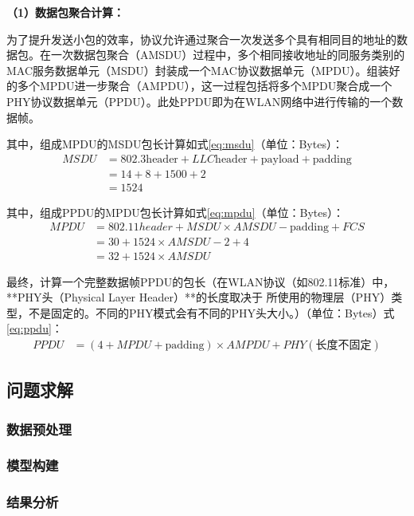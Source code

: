 \documentclass[bwprint]{gmcmthesis}
\begin{document}
\textbf{（1）数据包聚合计算：}

为了提升发送小包的效率，协议允许通过聚合一次发送多个具有相同目的地址的数据包。在一次数据包聚合（AMSDU）过程中，多个相同接收地址的同服务类别的MAC服务数据单元（MSDU）封装成一个MAC协议数据单元（MPDU）。组装好的多个MPDU进一步聚合（AMPDU），这一过程包括将多个MPDU聚合成一个PHY协议数据单元（PPDU）。此处PPDU即为在WLAN网络中进行传输的一个数据帧。

其中，组成MPDU的MSDU包长计算如式\ref{eq:msdu}（单位：Bytes）：
\begin{align}
    MSDU &= 802.3\text{header} + LLC\text{header} + \text{payload} + \text{padding} \nonumber\\
         &= 14 + 8 + 1500 + 2 \label{eq:msdu} \\
         &= 1524\nonumber
    \end{align}
    
其中，组成PPDU的MPDU包长计算如式\ref{eq:mpdu}（单位：Bytes）：
\begin{align}
    MPDU &= 802.11header + MSDU \times AMSDU - \text{padding} + FCS \nonumber\\
         &= 30 + 1524 \times AMSDU - 2 + 4 \label{eq:mpdu}\\
         &= 32 + 1524 \times AMSDU \nonumber
    \end{align}
    
最终，计算一个完整数据帧PPDU的包长（在WLAN协议（如802.11标准）中，**PHY头（Physical Layer Header）**的长度取决于
所使用的物理层（PHY）类型，不是固定的。不同的PHY模式会有不同的PHY头大小。）（单位：Bytes）式\ref{eq:ppdu}：
\begin{align}
    PPDU &= (4 + MPDU + \text{padding}) \times AMPDU + PHY(\text{长度不固定}) \label{eq:ppdu}
    \end{align}
    

\subsection{问题求解}
\subsubsection{数据预处理}
\subsubsection{模型构建}
\subsubsection{结果分析}
\end{document}
